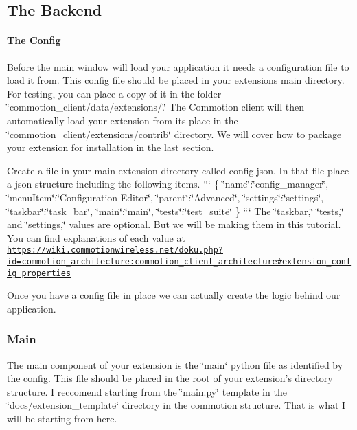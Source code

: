 \subsection*{The Backend}

\paragraph*{The Config}

Before the main window will load your application it needs a configuration file to load it from. This config file should be placed in your extensions main directory. For testing, you can place a copy of it in the folder \char`\"{}commotion\+\_\+client/data/extensions/.\char`\"{} The Commotion client will then automatically load your extension from its place in the \char`\"{}commotion\+\_\+client/extensions/contrib\char`\"{} directory. We will cover how to package your extension for installation in the last section.

Create a file in your main extension directory called {\ttfamily config.\+json}. In that file place a json structure including the following items. ``` \{ \char`\"{}name\char`\"{}\+:\char`\"{}config\+\_\+manager\char`\"{}, \char`\"{}menu\+Item\char`\"{}\+:\char`\"{}\+Configuration Editor\char`\"{}, \char`\"{}parent\char`\"{}\+:\char`\"{}\+Advanced\char`\"{}, \char`\"{}settings\char`\"{}\+:\char`\"{}settings\char`\"{}, \char`\"{}taskbar\char`\"{}\+:\char`\"{}task\+\_\+bar\char`\"{}, \char`\"{}main\char`\"{}\+:\char`\"{}main\char`\"{}, \char`\"{}tests\char`\"{}\+:\char`\"{}test\+\_\+suite\char`\"{} \} ``` The \char`\"{}taskbar,\char`\"{} \char`\"{}tests,\char`\"{} and \char`\"{}settings,\char`\"{} values are optional. But we will be making them in this tutorial. You can find explanations of each value at \href{https://wiki.commotionwireless.net/doku.php?id=commotion_architecture:commotion_client_architecture#extension_config_properties}{\tt https\+://wiki.\+commotionwireless.\+net/doku.\+php?id=commotion\+\_\+architecture\+:commotion\+\_\+client\+\_\+architecture\#extension\+\_\+config\+\_\+properties}

Once you have a config file in place we can actually create the logic behind our application.

\subsubsection*{Main}

The main component of your extension is the \char`\"{}main\char`\"{} python file as identified by the config. This file should be placed in the root of your extension's directory structure. I reccomend starting from the \char`\"{}main.\+py\char`\"{} template in the \char`\"{}docs/extension\+\_\+template\char`\"{} directory in the commotion structure. That is what I will be starting from here.

